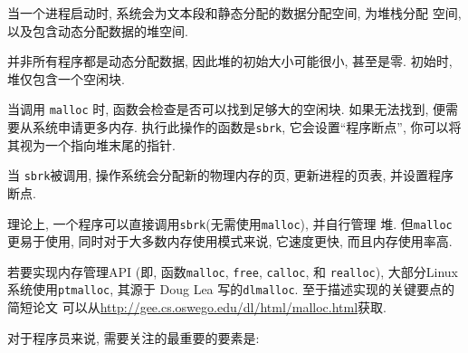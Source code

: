 \documentclass[12pt]{book}
\begin{document}
{%
当一个进程启动时, 系统会为文本段和静态分配的数据分配空间, 为堆栈分配
空间, 以及包含动态分配数据的堆空间. 

并非所有程序都是动态分配数据, 因此堆的初始大小可能很小, 甚至是零. 
初始时, 堆仅包含一个空闲块.

当调用 {\tt malloc} 时, 函数会检查是否可以找到足够大的空闲块. 
如果无法找到, 便需要从系统申请更多内存. 执行此操作的函数是{\tt sbrk}, 
它会设置``程序断点'', 你可以将其视为一个指向堆末尾的指针. 

当 {\tt sbrk}被调用, 操作系统会分配新的物理内存的页, 更新进程的页表, 
并设置程序断点.  

理论上, 一个程序可以直接调用{\tt sbrk}(无需使用{\tt malloc}), 并自行管理
堆. 但{\tt malloc} 更易于使用, 同时对于大多数内存使用模式来说, 
它速度更快, 而且内存使用率高.

若要实现内存管理API (即, 函数{\tt malloc}, {\tt free}, {\tt calloc}, 和 {\tt realloc}), 大部分Linux系统使用{\tt ptmalloc}, 
其源于 Doug Lea 写的{\tt dlmalloc}. 至于描述实现的关键要点的简短论文
可以从\url{http://gee.cs.oswego.edu/dl/html/malloc.html}获取.

对于程序员来说, 需要关注的最重要的要素是: 

}
\end{document}
